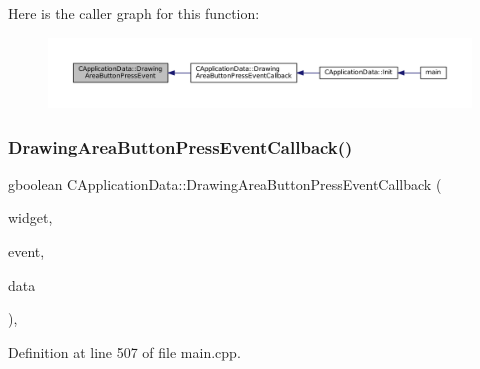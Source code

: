 Here is the caller graph for this function\+:\nopagebreak
\begin{figure}[H]
\begin{center}
\leavevmode
\includegraphics[width=350pt]{classCApplicationData_ae7516e29f629998e4068ae1584d0237c_icgraph}
\end{center}
\end{figure}
\hypertarget{classCApplicationData_aaa867e992733fa1e88e67c026c8a2947}{}\label{classCApplicationData_aaa867e992733fa1e88e67c026c8a2947} 
\subsubsection{\texorpdfstring{Drawing\+Area\+Button\+Press\+Event\+Callback()}{DrawingAreaButtonPressEventCallback()}}
{\footnotesize\ttfamily gboolean C\+Application\+Data\+::\+Drawing\+Area\+Button\+Press\+Event\+Callback (\begin{DoxyParamCaption}\item[{Gtk\+Widget $\ast$}]{widget,  }\item[{Gdk\+Event\+Button $\ast$}]{event,  }\item[{gpointer}]{data }\end{DoxyParamCaption})\hspace{0.3cm}{\ttfamily [static]}, {\ttfamily [protected]}}



Definition at line 507 of file main.\+cpp.


